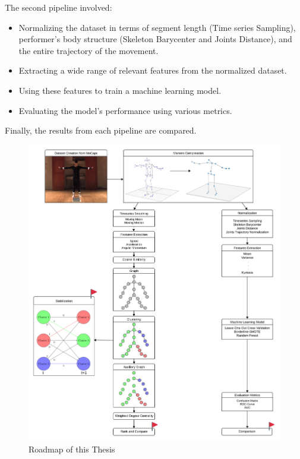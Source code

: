 The second pipeline involved:
\begin{itemize}
    \item Normalizing the dataset in terms of segment length (Time series Sampling), performer's body structure (Skeleton Barycenter and Joints Distance), and the entire trajectory of the movement.
    \item Extracting a wide range of relevant features from the normalized dataset.
    \item Using these features to train a machine learning model.
    \item Evaluating the model's performance using various metrics.
\end{itemize}
Finally, the results from each pipeline are compared.


\begin{figure}[H]
    \centering
    \includegraphics[width=\textwidth]{graphics/Walkthrough.png}
    \caption{Roadmap of this Thesis}
    \label{fig:walktrough}
\end{figure}
